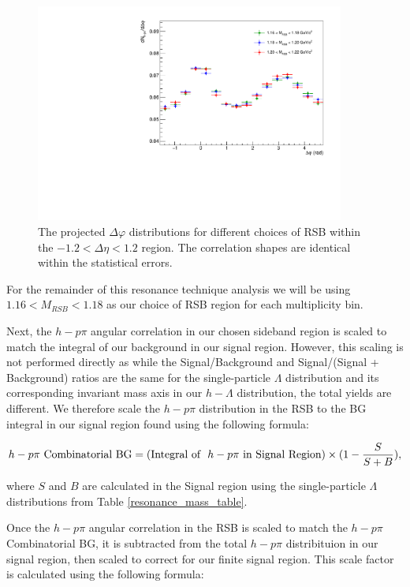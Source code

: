 \documentclass[ALICE,manyauthors]{ALICE_analysis_notes}
\begin{document}
\begin{itemize}
\begin{figure}[ht]
\centering
\includegraphics[width=4in]{figures/h_lambda_dphi_rsbcomp_0_20.pdf}
\caption{The projected $\Delta\varphi$ distributions for different choices of RSB within the $-1.2 < \Delta\eta < 1.2$ region. The correlation shapes are identical within the statistical errors.}
\label{normRSBcomp}
\end{figure}

For the remainder of this resonance technique analysis we will be using $1.16 < M_{RSB} < 1.18$ as our choice of RSB region for each multiplicity bin. 

Next, the $h-p\pi$ angular correlation in our chosen sideband region is scaled to match the integral of our background in our signal region. However, this scaling is not performed directly as while the Signal/Background and Signal/(Signal + Background) ratios are the same for the single-particle $\Lambda$ distribution and its corresponding invariant mass axis in our $h-\Lambda$ distribution, the total yields are different. We therefore scale the $h-p\pi$ distribution in the RSB to the BG integral in our signal region found using the following formula:

\begin{align}
	h-p\pi \text{\space Combinatorial BG} = (\text{Integral of \space} h-p\pi \text{\space in Signal Region}) \times (1 - \frac{S}{S+B}),
\end{align}

where $S$ and $B$ are calculated in the Signal region using the single-particle $\Lambda$ distributions from Table \ref{resonance_mass_table}.

Once the $h-p\pi$ angular correlation in the RSB is scaled to match the $h-p\pi$ Combinatorial BG, it is subtracted from the total $h-p\pi$ distribituion in our signal region, then scaled to correct for our finite signal region. This scale factor is calculated using the following formula:


\end{itemize}
\end{document}
